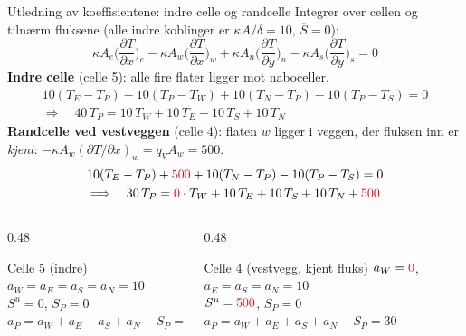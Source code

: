\documentclass[11pt,aspectratio=169]{beamer}
\begin{document}
\begin{frame}{Utledning av koeffisientene: indre celle og randcelle}
\footnotesize
Integrer over cellen og tilnærm fluksene (alle indre koblinger er $\kappa A/\delta = 10$, $\overline S = 0$):
\[
\kappa A_e\Big(\frac{\partial T}{\partial x}\Big)_e - \kappa A_w\Big(\frac{\partial T}{\partial x}\Big)_w + \kappa A_n\Big(\frac{\partial T}{\partial y}\Big)_n - \kappa A_s\Big(\frac{\partial T}{\partial y}\Big)_s = 0
\]
\textbf{Indre celle} (celle 5): alle fire flater ligger mot naboceller.
\begin{gather*}
10(T_E - T_P) - 10(T_P - T_W) + 10(T_N - T_P) - 10(T_P - T_S) = 0
\\
\Longrightarrow\quad 40\,T_P = 10\,T_W + 10\,T_E + 10\,T_S + 10\,T_N
\end{gather*}
\textbf{Randcelle ved vestveggen} (celle 4): flaten $w$ ligger i veggen, der fluksen inn er \emph{kjent}: $-\kappa A_w(\partial T/\partial x)_w = q_VA_w = 500$.
\begin{gather*}
10(T_E - T_P) + {\color{red}500} + 10(T_N - T_P) - 10(T_P - T_S) = 0
\\
\Longrightarrow\quad 30\,T_P = {\color{red}0}\cdot T_W + 10\,T_E + 10\,T_S + 10\,T_N + {\color{red}500}
\end{gather*}
\vspace{-1mm}
\begin{columns}[T]
\begin{column}{0.48\textwidth}
\begin{remb}{Celle 5 (indre)}
$a_W=a_E=a_S=a_N=10$\\
$S^u=0$, \quad $S_P=0$\\
$a_P = a_W+a_E+a_S+a_N-S_P = 40$
\end{remb}
\end{column}
\begin{column}{0.48\textwidth}
\begin{remb}{Celle 4 (vestvegg, kjent fluks)}
$a_W={\color{red}0}$, \quad $a_E=a_S=a_N=10$\\
$S^u={\color{red}500}$, \quad $S_P=0$\\
$a_P = a_W+a_E+a_S+a_N-S_P = 30$
\end{remb}
\end{column}
\end{columns}
\end{frame}
\end{document}
